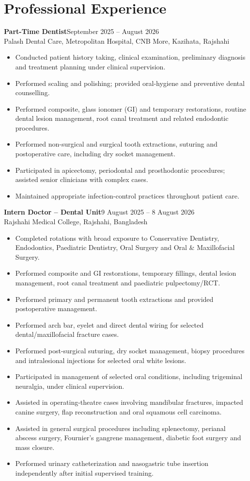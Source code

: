 \documentclass[10pt,a4paper]{article}
\newcommand{\role}[3]{\textbf{#1}\hfill {\small #2}\\#3}
\begin{document}
\section{Professional Experience}
\role{Part-Time Dentist}{September 2025 -- August 2026}{Palash Dental Care, Metropolitan Hospital, CNB More, Kazihata, Rajshahi}
\begin{itemize}
\item Conducted patient history taking, clinical examination, preliminary diagnosis and treatment planning under clinical supervision.
\item Performed scaling and polishing; provided oral-hygiene and preventive dental counselling.
\item Performed composite, glass ionomer (GI) and temporary restorations, routine dental lesion management, root canal treatment and related endodontic procedures.
\item Performed non-surgical and surgical tooth extractions, suturing and postoperative care, including dry socket management.
\item Participated in apicectomy, periodontal and prosthodontic procedures; assisted senior clinicians with complex cases.
\item Maintained appropriate infection-control practices throughout patient care.
\end{itemize}
\vspace{3pt}
\role{Intern Doctor -- Dental Unit}{9 August 2025 -- 8 August 2026}{Rajshahi Medical College, Rajshahi, Bangladesh}
\begin{itemize}
\item Completed rotations with broad exposure to Conservative Dentistry, Endodontics, Paediatric Dentistry, Oral Surgery and Oral \& Maxillofacial Surgery.
\item Performed composite and GI restorations, temporary fillings, dental lesion management, root canal treatment and paediatric pulpectomy/RCT.
\item Performed primary and permanent tooth extractions and provided postoperative management.
\item Performed arch bar, eyelet and direct dental wiring for selected dental/maxillofacial fracture cases.
\item Performed post-surgical suturing, dry socket management, biopsy procedures and intralesional injections for selected oral white lesions.
\item Participated in management of selected oral conditions, including trigeminal neuralgia, under clinical supervision.
\item Assisted in operating-theatre cases involving mandibular fractures, impacted canine surgery, flap reconstruction and oral squamous cell carcinoma.
\item Assisted in general surgical procedures including splenectomy, perianal abscess surgery, Fournier's gangrene management, diabetic foot surgery and mass closure.
\item Performed urinary catheterization and nasogastric tube insertion independently after initial supervised training.
\end{itemize}
\end{document}
